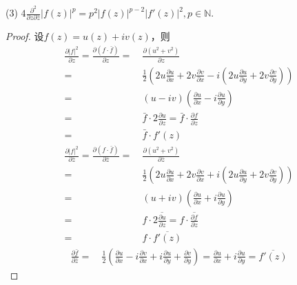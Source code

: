 \documentclass[12pt, a4paper, oneside]{ctexart}
\begin{document}
(3) $4\frac{\partial^2}{\partial z\partial\bar{z}}|f(z)|^p=p^2|f(z)|^{p-2}|f'(z)|^2,p\in\mathbb{N}$.
\begin{proof} 设$f(z) = u(z) + iv(z)$，则
    \begin{equation}
        \begin{aligned}
            \frac{\partial |f|^2}{\partial z} = \frac{\partial (f\cdot \bar{f})}{\partial z}=&\ \frac{\partial (u^2+v^2)}{\partial z}\\
            =&\ \frac{1}{2}\left(2u\frac{\partial u}{\partial x}+2v\frac{\partial v}{\partial x}-i\left(2u\frac{\partial u}{\partial y}+2v\frac{\partial v}{\partial y}\right)\right)\\
            =&\ (u-iv)\left(\frac{\partial u}{\partial x}-i\frac{\partial u}{\partial y}\right)\\
            =&\ \bar{f}\cdot 2\frac{\partial u}{\partial z} = \bar{f}\cdot \frac{\partial f}{\partial z}\\
            =&\ \bar{f}\cdot f'(z)
        \end{aligned}
    \end{equation}
    \begin{equation}
        \begin{aligned}
            \frac{\partial |f|^2}{\partial \bar{z}} = \frac{\partial (f\cdot \bar{f})}{\partial \bar{z}}=&\ \frac{\partial (u^2+v^2)}{\partial \bar{z}}\\
            =&\ \frac{1}{2}\left(2u\frac{\partial u}{\partial x}+2v\frac{\partial v}{\partial x}+i\left(2u\frac{\partial u}{\partial y}+2v\frac{\partial v}{\partial y}\right)\right)\\
            =&\ (u+iv)\left(\frac{\partial u}{\partial x}+i\frac{\partial u}{\partial y}\right)\\
            =&\ f\cdot 2\overline{\frac{\partial u}{\partial z}} = f\cdot \overline{\frac{\partial f}{\partial z}}\\
            =&\ f\cdot \overline{f'(z)}
        \end{aligned}
    \end{equation}
    \begin{equation}
        \begin{aligned}
            \frac{\partial \bar{f}}{\partial \bar{z}}=&\ \frac{1}{2}\left(\frac{\partial u}{\partial x}-i\frac{\partial v}{\partial x}+i\frac{\partial u}{\partial y}+\frac{\partial v}{\partial y}\right) = \frac{\partial u}{\partial x}+i\frac{\partial u}{\partial y} = \overline{f'(z)}
        \end{aligned}

\end{equation}
\end{proof}
\end{document}
